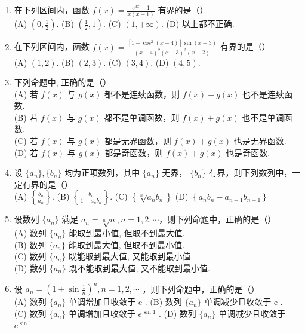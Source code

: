 \documentclass[12pt, a4paper]{ctexart}
\begin{document}
\begin{enumerate}
    \item 在下列区间内，函数 $ f(x)=\frac{e^{3x}-1}{x(x-1)} $ 有界的是（）\\
    (A) $ \left(0,\frac{1}{2}\right) $. \quad (B) $ \left(\frac{1}{2},1\right) $. \quad (C) $ \left(1,+\infty\right) $. \quad (D) 以上都不正确.

    \item 在下列区间内，函数 $ f(x)=\frac{\left[1-\cos^{2}\left(x-4\right)\right]\sin\left(x-3\right)}{\left(x-4\right)^{2}\left(x-3\right)^{2}\left(x-2\right)} $ 有界的是（）\\
    (A) $ (1,2) $. \quad (B) $ (2,3) $. \quad (C) $ (3,4) $. \quad (D) $ (4,5) $.

    \item 下列命题中, 正确的是（）\\
    (A) 若 $ f(x) $ 与 $ g(x) $ 都不是连续函数，则 $ f(x) + g(x) $ 也不是连续函数.\\
    (B) 若 $ f(x) $ 与 $ g(x) $ 都不是单调函数，则 $ f(x) + g(x) $ 也不是单调函数.\\
    (C) 若 $ f(x) $ 与 $ g(x) $ 都是无界函数，则 $ f(x) + g(x) $ 也是无界函数.\\
    (D) 若 $ f(x) $ 与 $ g(x) $ 都是奇函数，则 $ f(x) + g(x) $ 也是奇函数.

    \item 设 $ \{a_{n}\}, \{b_{n}\} $ 均为正项数列，其中 $ \{a_{n}\} $ 无界， $ \{b_{n}\} $ 有界，则下列数列中，一定有界的是（）\\
    (A) $ \left\{\frac{b_{n}}{a_{n}}\right\}. $ \quad (B) $ \left\{\frac{b_{n}}{1+a_{n}b_{n}}\right\}. $ \quad (C) $ \left\{\sqrt[n]{a_{n}b_{n}}\right\} $ \quad (D) $ \left\{a_{n}b_{n}-a_{n-1}b_{n-1}\right\} $

    \item 设数列 $ \{a_n\} $ 满足 $ a_n = \sqrt[n]{n}, n = 1, 2, \cdots $，则下列命题中，正确的是（）\\
    (A) 数列 $ \{a_{n}\} $ 能取到最小值, 但取不到最大值.\\
    (B) 数列 $ \{a_{n}\} $ 能取到最大值, 但取不到最小值.\\
    (C) 数列 $ \{a_{n}\} $ 既能取到最大值, 又能取到最小值.\\
    (D) 数列 $ \{a_{n}\} $ 既不能取到最大值, 又不能取到最小值.

    \item 设 $ a_{n}=\left(1+\sin\frac{1}{n}\right)^{n}, n=1,2,\cdots $ ，则下列命题中，正确的是（）\\
    (A) 数列 $ \{a_{n}\} $ 单调增加且收敛于 e . \quad (B) 数列 $ \{a_{n}\} $ 单调减少且收敛于 e .\\
    (C) 数列 $ \{a_{n}\} $ 单调增加且收敛于 $ e^{\sin 1} $ . \quad (D) 数列 $ \{a_{n}\} $ 单调减少且收敛于 $ e^{\sin 1} $


\end{enumerate}
\end{document}
